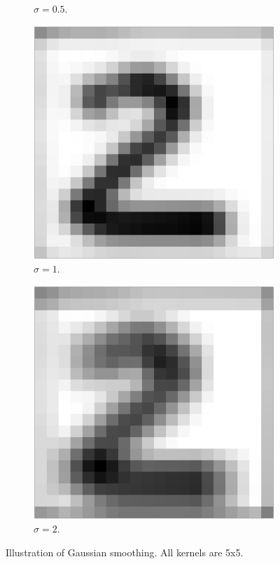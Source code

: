 \begin{figure}[H]
\begin{subfigure}[b]{0.2\textwidth}
         \caption{\(\sigma = 0.5\).}
	\end{subfigure}
	\qquad
	\begin{subfigure}[b]{0.2\textwidth}
         \includegraphics[width=\textwidth]{graphics/smooth_1_5}
         \caption{\(\sigma = 1\).}
	\end{subfigure}
	\qquad
	\begin{subfigure}[b]{0.2\textwidth}
         \includegraphics[width=\textwidth]{graphics/smooth_2_5}
         \caption{\(\sigma = 2\).}
	\end{subfigure}
\caption{Illustration of Gaussian smoothing. All kernels are 5x5.}
\label{fig:effect_smooth}
\end{figure}

